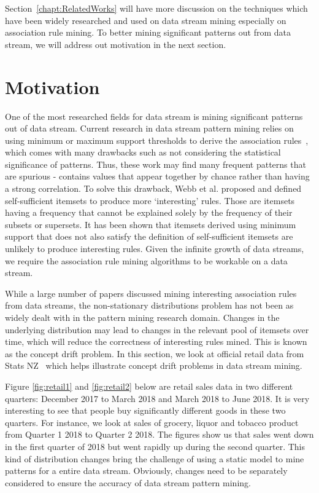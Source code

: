 Section~\ref{chapt:RelatedWorks} will have more discussion on the techniques which have been widely researched and used on data stream mining especially on association rule mining. To better mining significant patterns out from data stream, we will address out motivation in the next section.


\section{Motivation}

One of the most researched fields for data stream is mining significant patterns out of data stream. Current research in data stream pattern mining relies on using minimum or maximum support thresholds to derive the association rules~\cite{kingfisher}, which comes with many drawbacks such as not considering the statistical significance of patterns. Thus, these work may find many frequent patterns that are spurious - contains values that appear together by chance rather than having a strong correlation. To solve this drawback, Webb et al. \cite{ssi,topk} proposed and defined self-sufficient itemsets to produce more `interesting' rules. Those are itemsets having a frequency that cannot be explained solely by the frequency of their subsets or supersets. It has been shown that itemsets derived using minimum support that does not also satisfy the definition of self-sufficient itemsets are unlikely to produce interesting rules. Given the infinite growth of data streams, we require the association rule mining algorithms to be workable on a data stream. 


While a large number of papers discussed mining interesting association rules from data streams, the non-stationary distributions problem has not been as widely dealt with in the pattern mining research domain. Changes in the underlying distribution may lead to changes in the relevant pool of itemsets over time, which will reduce the correctness of interesting rules mined. This is known as the concept drift problem. In this section, we look at official retail data from Stats NZ~\cite{statsnz} which helps illustrate concept drift problems in data stream mining.

Figure \ref{fig:retail1} and \ref{fig:retail2} below are retail sales data in two different quarters: December 2017 to March 2018 and March 2018 to June 2018. It is very interesting to see that people buy significantly different goods in these two quarters. For instance, we look at sales of grocery, liquor and tobacco product from Quarter 1 2018 to Quarter 2 2018. The figures show us that sales went down in the first quarter of 2018 but went rapidly up during the second quarter. This kind of distribution changes bring the challenge of using a static model to mine patterns for a entire data stream. Obviously, changes need to be separately considered to ensure the accuracy of data stream pattern mining. 

